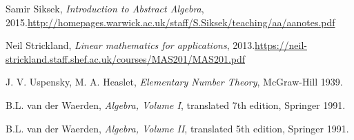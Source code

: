 \documentclass[numbers=enddot,12pt,final,onecolumn,notitlepage]{scrartcl}%
\numberwithin{exer}{section}
\theoremstyle{definition}
\begin{document}
\begin{thebibliography}{99999999}
Samir Siksek, \textit{Introduction to Abstract
Algebra}, 2015.\newline\url{http://homepages.warwick.ac.uk/staff/S.Siksek/teaching/aa/aanotes.pdf}

Neil Strickland, \textit{Linear mathematics for
applications}, 2013.\newline\url{https://neil-strickland.staff.shef.ac.uk/courses/MAS201/MAS201.pdf}

J. V. Uspensky, M. A. Heaslet,
\textit{Elementary Number Theory}, McGraw-Hill 1939.

B.L. van der Waerden, \textit{Algebra, Volume I},
translated 7th edition, Springer 1991.

B.L. van der Waerden, \textit{Algebra, Volume II},
translated 5th edition, Springer 1991.
\end{thebibliography}
\end{document}
